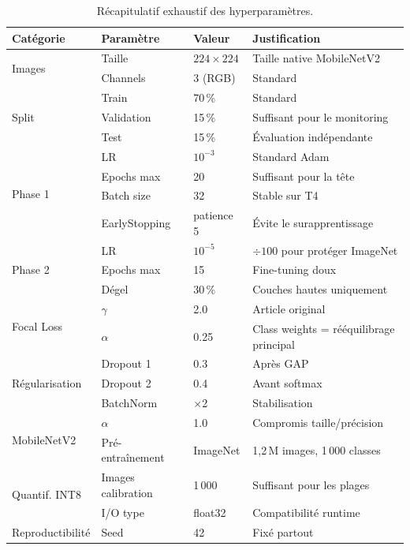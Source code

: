 \documentclass[12pt, a4paper, twoside]{report}
\begin{document}
\begin{table}[H]
\centering
\caption{Récapitulatif exhaustif des hyperparamètres.}
\label{tab:all-hyperparams}
\small
\begin{tabular}{llll}
\toprule
\textbf{Catégorie} & \textbf{Paramètre} & \textbf{Valeur} & \textbf{Justification} \\
\midrule
\multirow{2}{*}{Images}
  & Taille & $224 \times 224$ & Taille native MobileNetV2 \\
  & Channels & 3 (RGB) & Standard \\
\midrule
\multirow{3}{*}{Split}
  & Train & 70\,\% & Standard \\
  & Validation & 15\,\% & Suffisant pour le monitoring \\
  & Test & 15\,\% & Évaluation indépendante \\
\midrule
\multirow{4}{*}{Phase 1}
  & LR & $10^{-3}$ & Standard Adam \\
  & Epochs max & 20 & Suffisant pour la tête \\
  & Batch size & 32 & Stable sur T4 \\
  & EarlyStopping & patience 5 & Évite le surapprentissage \\
\midrule
\multirow{3}{*}{Phase 2}
  & LR & $10^{-5}$ & $\div 100$ pour protéger ImageNet \\
  & Epochs max & 15 & Fine-tuning doux \\
  & Dégel & 30\,\% & Couches hautes uniquement \\
\midrule
\multirow{2}{*}{Focal Loss}
  & $\gamma$ & 2.0 & Article original \\
  & $\alpha$ & 0.25 & Class weights = rééquilibrage principal \\
\midrule
\multirow{3}{*}{Régularisation}
  & Dropout 1 & 0.3 & Après GAP \\
  & Dropout 2 & 0.4 & Avant softmax \\
  & BatchNorm & $\times$2 & Stabilisation \\
\midrule
\multirow{2}{*}{MobileNetV2}
  & $\alpha$ & 1.0 & Compromis taille/précision \\
  & Pré-entraînement & ImageNet & 1,2\,M images, 1\,000 classes \\
\midrule
\multirow{2}{*}{Quantif. INT8}
  & Images calibration & 1\,000 & Suffisant pour les plages \\
  & I/O type & float32 & Compatibilité runtime \\
\midrule
  Reproductibilité & Seed & 42 & Fixé partout \\
\bottomrule
\end{tabular}
\end{table}
\end{document}
